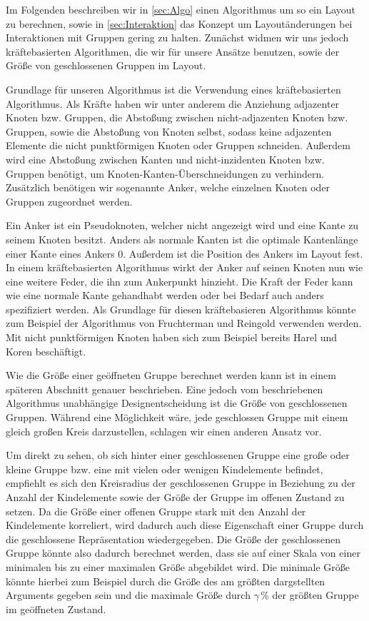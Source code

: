 Im Folgenden beschreiben wir  in \autoref{sec:Algo} einen Algorithmus um so ein Layout zu berechnen, 
sowie in \autoref{sec:Interaktion} das Konzept um Layoutänderungen bei Interaktionen mit Gruppen gering zu halten.
Zunächst widmen wir uns jedoch kräftebasierten Algorithmen, die wir für unsere Ansätze benutzen, sowie der Größe von geschlossenen Gruppen im Layout.

Grundlage für unseren Algorithmus ist die Verwendung eines kräftebasierten Algorithmus. Als Kräfte haben wir unter anderem die Anziehung adjazenter Knoten bzw. Gruppen,
die Abstoßung zwischen nicht-adjazenten Knoten bzw. Gruppen, sowie die Abstoßung von Knoten selbst, sodass keine adjazenten Elemente die nicht punktförmigen Knoten oder Gruppen schneiden. Außerdem wird eine Abstoßung zwischen Kanten und nicht-inzidenten Knoten bzw. Gruppen benötigt, um Knoten-Kanten-Überschneidungen zu verhindern.
Zusätzlich benötigen wir sogenannte Anker, welche einzelnen Knoten oder Gruppen zugeordnet werden. 

Ein Anker ist ein Pseudoknoten, welcher nicht angezeigt wird und eine Kante zu seinem Knoten besitzt. %
Anders als normale Kanten ist die optimale Kantenlänge einer Kante eines Ankers 0. Außerdem ist die Position des Ankers im Layout fest.
In einem kräftebasierten Algorithmus wirkt der Anker auf seinen Knoten nun wie eine weitere Feder, die ihn zum Ankerpunkt hinzieht.
Die Kraft der Feder kann wie eine normale Kante gehandhabt werden oder bei Bedarf auch anders spezifiziert werden.
Als Grundlage für diesen kräftebasieren Algorithmus könnte zum Beispiel der Algorithmus von Fruchterman und Reingold \cite{SPE:SPE4380211102} verwenden werden.
Mit nicht punktförmigen Knoten haben sich zum Beispiel bereits Harel und Koren \cite{Harel:2002:DGN:1556262.1556288} beschäftigt.


Wie die Größe einer geöffneten Gruppe berechnet werden kann ist in einem späteren Abschnitt genauer beschrieben. 
Eine jedoch vom beschriebenen Algorithmus unabhängige Designentscheidung ist die Größe von geschlossenen Gruppen.
Während eine Möglichkeit wäre, jede geschlossen Gruppe mit einem gleich großen Kreis darzustellen, schlagen wir einen anderen Ansatz vor.

Um direkt zu sehen, ob sich hinter einer geschlossenen Gruppe eine große oder kleine Gruppe bzw. eine mit vielen oder wenigen Kindelemente befindet, empfiehlt es sich den Kreisradius der geschlossenen Gruppe in Beziehung zu der Anzahl der Kindelemente sowie der Größe der Gruppe im offenen Zustand zu setzen.
Da die Größe einer offenen Gruppe stark mit den Anzahl der Kindelemente korreliert, wird dadurch auch diese Eigenschaft einer Gruppe durch die geschlossene Repräsentation
wiedergegeben.
Die Größe der geschlossenen Gruppe könnte also dadurch berechnet werden, dass sie auf einer Skala von einer minimalen bis zu einer maximalen Größe abgebildet wird.
Die minimale Größe könnte hierbei zum Beispiel durch die Größe des am größten dargstellten Arguments gegeben sein und die maximale Größe durch $\gamma \,\%$ 
der größten Gruppe im geöffneten Zustand.

